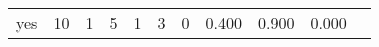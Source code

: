 \begin{longtable}{lp{1.10cm}p{1.10cm}p{1.10cm}p{1.10cm}p{1.10cm}p{1.10cm}p{1.10cm}p{1.10cm}p{1.10cm}p{1.10cm}}
yes       &                     10 &                                  1 &                                 5 &                                1 &                                 3 &                               0 &                          0.400 &                                 0.900 &                               0.000 \\
\end{longtable}
